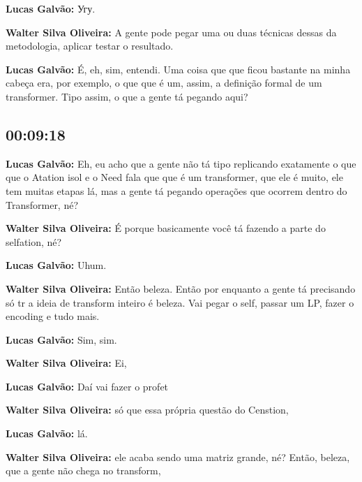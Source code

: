 \textbf{Lucas Galvão:} Угу.



\textbf{Walter Silva Oliveira:} A gente pode pegar uma ou duas técnicas dessas da metodologia, aplicar testar o resultado.



\textbf{Lucas Galvão:} É, eh, sim, entendi. Uma coisa que que ficou bastante na minha cabeça era, por exemplo, o que que é um, assim, a definição formal de um transformer. Tipo assim, o que a gente tá pegando aqui?



\subsection{\textbf{00:09:18}}



\textbf{Lucas Galvão:} Eh, eu acho que a gente não tá tipo replicando exatamente o que que o Atation isol e o Need fala que que é um transformer, que ele é muito, ele tem muitas etapas lá, mas a gente tá pegando operações que ocorrem dentro do Transformer, né?



\textbf{Walter Silva Oliveira:} É porque basicamente você tá fazendo a parte do selfation, né?



\textbf{Lucas Galvão:} Uhum.



\textbf{Walter Silva Oliveira:} Então beleza. Então por enquanto a gente tá precisando só tr a ideia de transform inteiro é beleza. Vai pegar o self, passar um LP, fazer o encoding e tudo mais.



\textbf{Lucas Galvão:} Sim, sim.



\textbf{Walter Silva Oliveira:} Ei,



\textbf{Lucas Galvão:} Daí vai fazer o profet



\textbf{Walter Silva Oliveira:} só que essa própria questão do Censtion,



\textbf{Lucas Galvão:} lá.



\textbf{Walter Silva Oliveira:} ele acaba sendo uma matriz grande, né? Então, beleza, que a gente não chega no transform,



